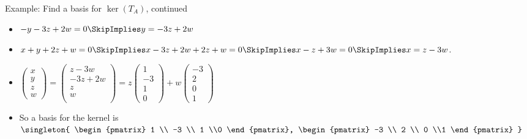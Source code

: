 \documentclass{beamer}
\begin{document}
\begin{frame}{Example: Find a basis for $\ker(T_A)$, continued}

\begin{itemize}
\item $-y -3z + 2w = 0 \SkipImplies y = -3z + 2w$
\item $x + y +2z + w = 0 \SkipImplies x -3z + 2w + 2z + w = 0 \SkipImplies x-z+3w = 0 \SkipImplies x = z-3w$.
\item
$
\begin{pmatrix}
x \\
y \\
z \\
w
\end{pmatrix}
=
\begin{pmatrix}
z-3w \\
-3z+2w \\
z \\
w \\
\end{pmatrix}
=
z
\begin{pmatrix}
1 \\ -3 \\ 1 \\0
\end{pmatrix}
+
w
\begin{pmatrix}
-3 \\ 2 \\ 0 \\1
\end{pmatrix}
$
\item
So a basis for the kernel is
$\singleton{
\begin{pmatrix}
1 \\ -3 \\ 1 \\0
\end{pmatrix},
\begin{pmatrix}
-3 \\ 2 \\ 0 \\1
\end{pmatrix}
}$
\end{itemize}

\end{frame}

\end{document}
